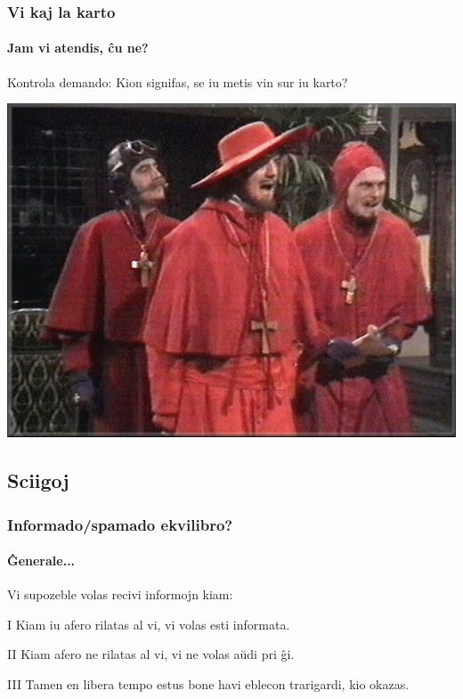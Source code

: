 \documentclass{beamer}
\begin{document}
	    

  \begin{frame}
    \frametitle{Vi kaj la karto}
    \framesubtitle{Jam vi atendis, ĉu ne?}
	
	\begin{center}
		\begin{block}{Kontrola demando:}
			Kion signifas, se iu metis vin sur iu karto?
		\end{block}
	\end{center}
	
	\begin{center}
	    \includegraphics[scale=0.3]{meme/hispana_inkvizicio}
    \end{center}	    
    
  \end{frame}


\subsection{Sciigoj}
  \begin{frame}
    \frametitle{Informado/spamado ekvilibro?}
	\framesubtitle{Ĝenerale...}
	Vi supozeble volas recivi informojn kiam:
	\pause
	\begin{block}{I}
		Kiam iu afero rilatas al vi, vi volas esti informata.
	\end{block}
	\pause
	\begin{block}{II}
		Kiam afero ne rilatas al vi, vi ne volas aŭdi pri ĝi.
	\end{block}
	\pause
	\begin{block}{III}
		Tamen en libera tempo estus bone havi eblecon trarigardi, kio okazas.
	\end{block}
	
  \end{frame}
\end{document}

